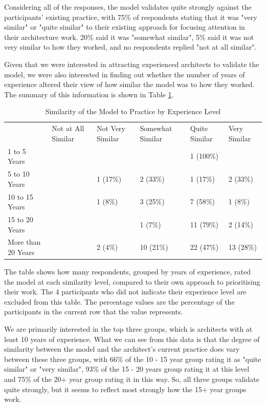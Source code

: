 Considering all of the responses, the model validates quite strongly against the participants' existing practice, with 75\% of respondents stating that it was "very similar" or "quite similar" to their existing approach for focusing attention in their architecture work.  20\% said it was "somewhat similar", 5\% said it was not very similar to how they worked, and no respondents replied "not at all similar".

Given that we were interested in attracting experienced architects to validate the model, we were also interested in finding out whether the number of years of experience altered their view of how similar the model was to how they worked.  The summary of this information is shown in Table \ref{table:similaritybyexp}.


\begin{table}
\caption{Similarity of the Model to Practice by Experience Level}
\label{table:similaritybyexp}
\footnotesize
\begin{tabular}{l p{1.5cm} p{1.5cm} p{1.5cm} p{1.5cm} p{1.5cm}}
                & Not at All Similar & Not Very Similar & Somewhat Similar & Quite Similar & Very Similar \\
1 to 5 Years       & &          &           & 1 (100\%) &	        \\
5 to 10 Years      & & 1 (17\%) & 2 (33\%)  & 1 (17\%)  & 2 (33\%)  \\
10 to 15 Years     & & 1 (8\%)  & 3 (25\%)  & 7 (58\%)  & 1 (8\%)   \\
15 to 20 Years     & &          & 1 (7\%)   & 11 (79\%) & 2 (14\%)  \\
More than 20 Years & & 2 (4\%)  & 10 (21\%) & 22 (47\%) & 13 (28\%) \\
\end{tabular}
\end{table}

The table shows how many respondents, grouped by years of experience, rated the model at each similarity level, compared to their own approach to prioritising their work.  The 4 participants who did not indicate their experience level are excluded from this table.  The percentage values are the percentage of the participants in the current row that the value represents.

We are primarily interested in the top three groups, which is architects with at least 10 years of experience.  What we can see from this data is that the degree of similarity between the model and the architect's current practice does vary between these three groups, with 66\% of the 10 - 15 year group rating it as "quite similar" or "very similar", 93\% of the 15 - 20 years group rating it at this level and 75\% of the 20+ year group rating it in this way.  So, all three groups validate quite strongly, but it seems to reflect most strongly how the 15+ year groups work.

